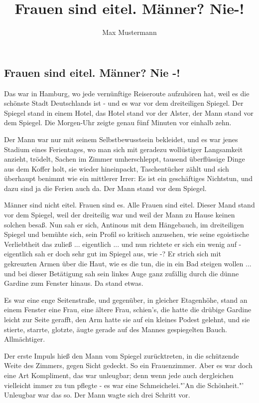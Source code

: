 \documentclass[12pt,a4paper]{scrartcl}
\begin{document}
 
\author{Max Mustermann} 
\title{Frauen sind eitel. Männer? Nie-!} 
\maketitle 
\modulolinenumbers[5]
%
\begin{linenumbers}
\section{Frauen sind eitel. Männer? Nie -!}
Das war in Hamburg, wo jede vernünftige Reiseroute aufzuhören hat, weil es die schönste Stadt Deutschlands ist - und es war vor dem dreiteiligen Spiegel. Der Spiegel stand in einem Hotel, das Hotel stand vor der Alster, der Mann stand vor dem Spiegel. Die Morgen-Uhr zeigte genau fünf Minuten vor einhalb zehn.

Der Mann war nur mit seinem Selbstbewusstsein bekleidet, und es war jenes Stadium eines Ferientages, wo man sich mit geradezu wollüstiger Langsamkeit anzieht, trödelt, Sachen im Zimmer umherschleppt, tausend überflüssige Dinge aus dem Koffer holt, sie wieder hineinpackt, Taschentücher zählt und sich überhaupt benimmt wie ein mittlerer Irrer: Es ist ein geschäftiges Nichtstun, und dazu sind ja die Ferien auch da. Der Mann stand vor dem Spiegel.

Männer sind nicht eitel. Frauen sind es. Alle Frauen sind eitel. Dieser Mand stand vor dem Spiegel, weil der dreiteilig war und weil der Mann zu Hause keinen solchen besaß. Nun sah er sich, Antinous mit dem Hängebauch, im dreiteiligen Spiegel und bemühte sich, sein Profil so kritisch anzusehen, wie seine egoistische Verliebtheit das zuließ ... eigentlich ... und nun richtete er sich ein wenig auf - eigentlich sah er doch sehr gut im Spiegel aus, wie -? Er strich sich mit gekreuzten Armen über die Haut, wie es die tun, die in ein Bad steigen wollen ... und bei dieser Betätigung sah sein linkes Auge ganz zufällig durch die dünne Gardine zum Fenster hinaus. Da stand etwas.

Es war eine enge Seitenstraße, und gegenüber, in gleicher Etagenhöhe, stand an einem Fenster eine Frau, eine ältere Frau, schien's, die hatte die drübige Gardine leicht zur Seite gerafft, den Arm hatte sie auf ein kleines Podest gelehnt, und sie stierte, starrte, glotzte, äugte gerade auf des Mannes gespiegelten Bauch. Allmächtiger.

Der erste Impuls hieß den Mann vom Spiegel zurücktreten, in die schützende Weite des Zimmers, gegen Sicht gedeckt. So ein Frauenzimmer. Aber es war doch eine Art Kompliment, das war unleugbar; denn wenn jede auch dergleichen vielleicht immer zu tun pflegte - es war eine Schmeichelei."'An die Schönheit."' Unleugbar war das so. Der Mann wagte sich drei Schritt vor.


\end{linenumbers}
\end{document}
